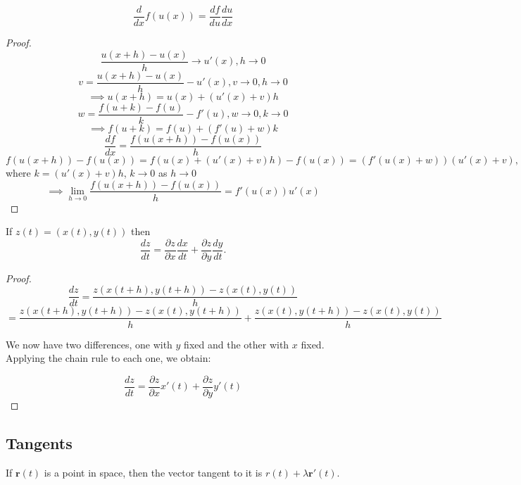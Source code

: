 \documentclass[a4paper,10pt]{article}
\begin{document}
\begin{thm}
	\[ \frac{d}{dx} f(u(x)) = \frac{df}{du} \frac{du}{dx} \]
\end{thm}

\begin{proof}
	\[ \frac{u(x+h) - u(x)}{h} \to u'(x), h \to 0 \]
	\[ v = \frac{u(x+h) - u(x)}{h} - u'(x), v \to 0, h \to 0 \]
	\[ \implies u(x+h) = u(x) + (u'(x) + v)h \]
	\[ w = \frac{f(u+k) - f(u)}{k} - f'(u), w \to 0, k \to 0 \]
	\[ \implies f(u+k) = f(u) + (f'(u) + w)k \]
	\[ \frac{df}{dx} = \frac{f(u(x+h)) - f(u(x))}{h} \]
	\[ f(u(x+h)) - f(u(x))= f(u(x) + (u'(x)+v)h) - f(u(x))  = (f'(u(x) +
	w))(u'(x) + v), \]
	where $k = (u'(x)+v)h$, $k \to 0$ as $h \to 0$
	\[ \implies \lim_{h \to 0} \frac{f(u(x+h)) - f(u(x))}{h} =
	f'(u(x))u'(x) \]

\end{proof}

\begin{lemma}
	If $z(t) = (x(t), y(t))$ then
	\[ \frac{dz}{dt} = \frac{\partial z}{\partial x}\frac{dx}{dt} +
	\frac{\partial z}{\partial y}\frac{dy}{dt}. \]
\end{lemma}

\begin{proof}
	\[ \frac{dz}{dt} = \frac{z(x(t+h), y(t+h)) - z(x(t), y(t))}{h} \]
	\[ = \frac{z(x(t+h), y(t+h)) - z(x(t), y(t+h))}{h} + \frac{z(x(t),
	y(t+h)) - z(x(t), y(t))}{h} \]

	We now have two differences, one with $y$ fixed and the other with
	$x$ fixed. Applying the chain rule to each one, we obtain:

	\[ \frac{dz}{dt} = \frac{\partial z}{\partial x} x'(t) + \frac{\partial
	z}{\partial y} y'(t) \]
\end{proof}

\subsection{Tangents}

If $\mathbf{r}(t)$ is a point in space, then the vector tangent to it is $r(t) + \lambda
\mathbf{r}'(t)$.
\end{document}
